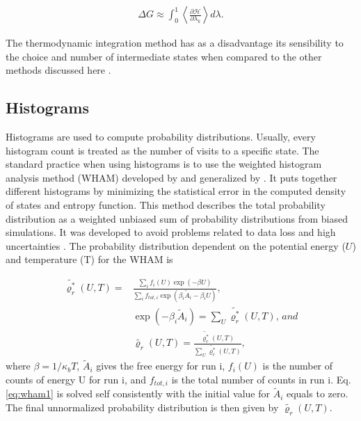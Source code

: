 \begin{equation}
\label{eq:ti4}
\begin{aligned}
\Delta G \approx \int _{0}^{1}  \left \langle \frac{\partial \mathcal{H}}{\partial \lambda _{k}}  \right \rangle d \lambda .
\end{aligned}
\end{equation}

The thermodynamic integration method has as a disadvantage its sensibility to the choice and number of intermediate states when compared to the other methods discussed here \cite{doi:10.1002/jcc.23229}. 

\subsection{Histograms}
Histograms are used to compute probability distributions. Usually, every histogram count is treated as the number of visits to a specific state. The standard practice when using histograms is to use the weighted histogram analysis method (WHAM) developed by  and generalized by  \cite{freeenergy}. It puts together different histograms by minimizing the statistical error in the computed density of states and entropy function. This method describes the total probability distribution as a weighted unbiased sum of probability distributions from biased simulations. It was developed to avoid problems related to data loss and high uncertainties \cite{ROUX1995275}. The probability distribution dependent on the potential energy ($U$) and temperature (T)  for the WHAM is

\begin{equation}
\label{eq:wham1}
\begin{aligned}
\tilde{\varrho_{r}^{*}}(U,T)  {}=& \frac{\sum_{i} f_{i}(U) \exp(- \beta U)}{\sum_{i} f_{tot,i} \exp(\beta _{i} \tilde{A}_{i} -\beta _{i} U) }, \\
& \exp(- \beta _{i} \tilde{A}_{i})  = \sum_{U} \tilde{\varrho_{r}^{*}}(U,T), \, and \\
& \tilde{\varrho_{r}}(U,T) = \frac{\tilde{\varrho_{r}^{*}}(U,T)}{\sum_{U} \tilde{\varrho_{r}^{*}}(U,T)},
\end{aligned}
\end{equation}
where $\beta = 1/\kappa_{b}T$, $\tilde{A}_{i}$ gives the free energy for run i, $f_{i}(U)$ is the number of counts of energy U for run i, and $f_{tot,i}$ is the total number of counts in run i. Eq. \eqref{eq:wham1} is solved self consistently with the initial value for $\tilde{A}_{i}$ equals to zero. The final unnormalized probability distribution is then given by $\tilde{\varrho_{r}}(U,T)$.

